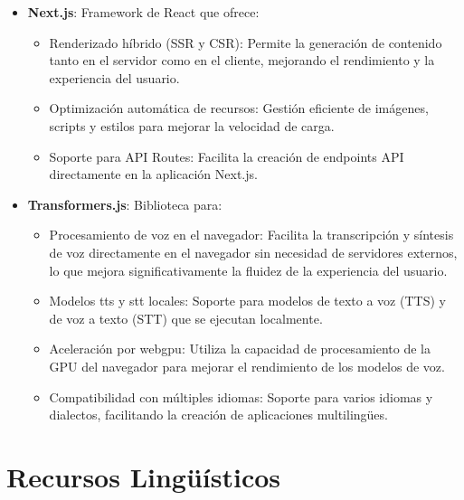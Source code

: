 \begin{itemize}
    \item \textbf{Next.js}: Framework de React que ofrece:
    \begin{itemize}
        \item Renderizado híbrido (SSR y CSR): Permite la generación de contenido tanto en el servidor como en el cliente, mejorando el rendimiento y la experiencia del usuario.
        \item Optimización automática de recursos: Gestión eficiente de imágenes, scripts y estilos para mejorar la velocidad de carga.
        \item Soporte para API Routes: Facilita la creación de endpoints API directamente en la aplicación Next.js.
    \end{itemize}
    
    \item \textbf{Transformers.js}: Biblioteca para:
    \begin{itemize}
          \item Procesamiento de voz en el navegador: Facilita la transcripción y síntesis de voz directamente en el navegador sin necesidad de servidores externos, lo que mejora significativamente la fluidez de la experiencia del usuario.
        \item Modelos \gls{tts} y \gls{stt} locales: Soporte para modelos de texto a voz (TTS) y de voz a texto (STT) que se ejecutan localmente.
        \item Aceleración por \gls{webgpu}: Utiliza la capacidad de procesamiento de la GPU del navegador para mejorar el rendimiento de los modelos de voz.
        \item Compatibilidad con múltiples idiomas: Soporte para varios idiomas y dialectos, facilitando la creación de aplicaciones multilingües.
    \end{itemize}
\end{itemize}

\section{Recursos Lingüísticos}

